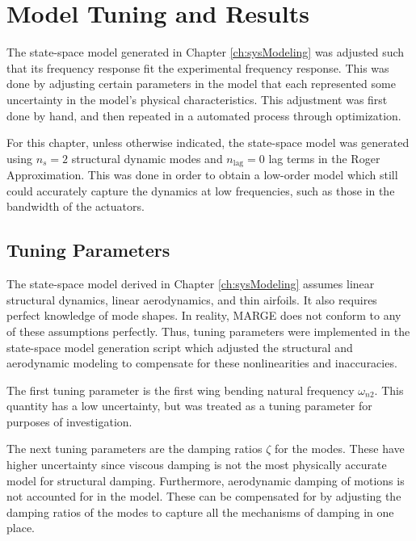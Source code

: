 \chapter{Model Tuning and Results}
\label{ch:tuning}

The state-space model generated in Chapter \ref{ch:sysModeling} was adjusted such that its frequency response fit the experimental frequency response. This was done by adjusting certain parameters in the model that each represented some uncertainty in the model's physical characteristics. This adjustment was first done by hand, and then repeated in a automated process through optimization.

For this chapter, unless otherwise indicated, the state-space model was generated using $n_s=2$ structural dynamic modes and $n_\text{lag}=0$ lag terms in the Roger Approximation. This was done in order to obtain a low-order model which still could accurately capture the dynamics at low frequencies, such as those in the bandwidth of the actuators.


\section{Tuning Parameters} %

The state-space model derived in Chapter \ref{ch:sysModeling} assumes linear structural dynamics, linear aerodynamics, and thin airfoils. It also requires perfect knowledge of mode shapes. In reality, MARGE does not conform to any of these assumptions perfectly. Thus, tuning parameters were implemented in the state-space model generation script which adjusted the structural and aerodynamic modeling to compensate for these nonlinearities and inaccuracies.

The first tuning parameter is the first wing bending natural frequency $\omega_{n2}$. This quantity has a low uncertainty, but was treated as a tuning parameter for purposes of investigation.

The next tuning parameters are the damping ratios $\zeta$ for the modes. These have higher uncertainty since viscous damping is not the most physically accurate model for structural damping. Furthermore, aerodynamic damping of motions is not accounted for in the model. These can be compensated for by adjusting the damping ratios of the modes to capture all the mechanisms of damping in one place.


